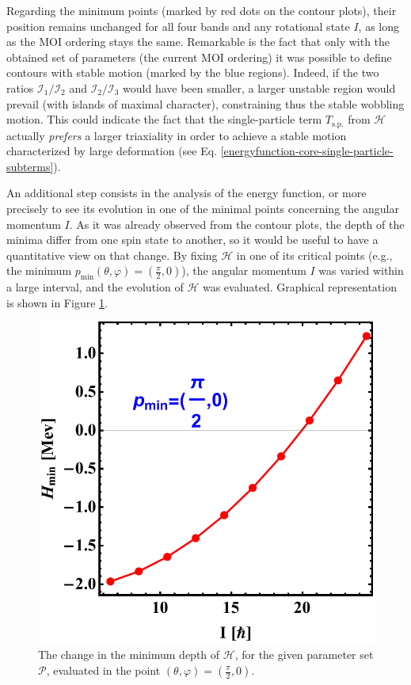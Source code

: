 \documentclass[11pt]{article}
\begin{document}
Regarding the minimum points (marked by red dots on the contour plots), their position remains unchanged for all four bands and any rotational state $I$, as long as the MOI ordering stays the same. Remarkable is the fact that only with the obtained set of parameters (the current MOI ordering) it was possible to define contours with stable motion (marked by the blue regions). Indeed, if the two ratios $\mathcal{I}_1/\mathcal{I}_2$ and $\mathcal{I}_2/\mathcal{I}_3$ would have been smaller, a larger unstable region would prevail (with islands of maximal character), constraining thus the stable wobbling motion. This could indicate the fact that the single-particle term $T_\text{s.p.}$ from $\mathcal{H}$ actually \emph{prefers} a larger triaxiality in order to achieve a stable motion characterized by large deformation (see Eq. \ref{energyfunction-core-single-particle-subterms}).

An additional step consists in the analysis of the energy function, or more precisely to see its evolution in one of the minimal points concerning the angular momentum $I$. As it was already observed from the contour plots, the depth of the minima differ from one spin state to another, so it would be useful to have a quantitative view on that change. By fixing $\mathcal{H}$ in one of its critical points (e.g., the minimum $p_\text{min}(\theta,\varphi)=(\frac{\pi}{2},0)$), the angular momentum $I$ was varied within a large interval, and the evolution of $\mathcal{H}$ was evaluated. Graphical representation is shown in Figure \ref{energy-function-minimum-evolution}.

\begin{figure}
    \centering
    \includegraphics[scale=0.65]{figs/energy_function_minPoint_Evolution.pdf}
    \caption{The change in the minimum depth of $\mathcal{H}$, for the given parameter set $\mathcal{P}$, evaluated in the point $(\theta,\varphi)=(\frac{\pi}{2},0)$.}
    \label{energy-function-minimum-evolution}
\end{figure}
\end{document}
